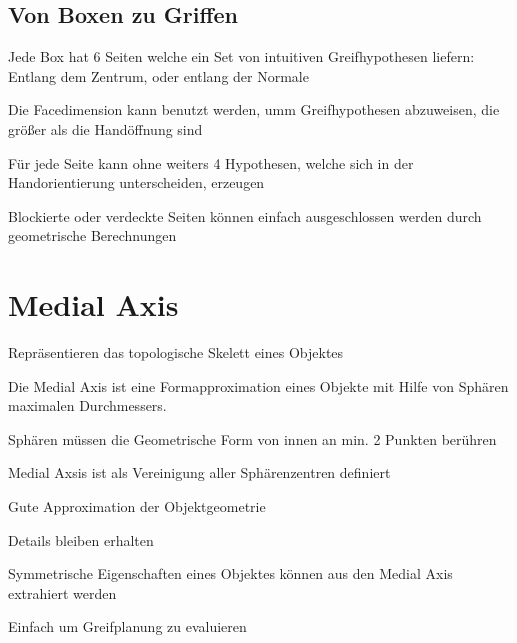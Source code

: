 \subsection{Von Boxen zu Griffen}
\begin{compactitem}
    \item Jede Box hat 6 Seiten welche ein Set von intuitiven Greifhypothesen liefern:
    Entlang dem Zentrum, oder entlang der Normale
    \item Die Facedimension kann benutzt werden, umm Greifhypothesen abzuweisen, die
    größer als die Handöffnung sind
    \item Für jede Seite kann ohne weiters 4 Hypothesen, welche sich in der Handorientierung
    unterscheiden, erzeugen
    \item Blockierte oder verdeckte Seiten können einfach ausgeschlossen werden durch
    geometrische Berechnungen
\end{compactitem}

\section{Medial Axis}
\begin{compactitem}
    \item Repräsentieren das topologische Skelett eines Objektes
    \item Die Medial Axis ist eine Formapproximation eines Objekte mit Hilfe von
     Sphären maximalen Durchmessers.
    \item Sphären müssen die Geometrische Form von innen an min. 2 Punkten berühren
    \item Medial Axsis ist als Vereinigung aller Sphärenzentren definiert

\end{compactitem}
\begin{compactitem}
    \item Gute Approximation der Objektgeometrie
    \item Details bleiben erhalten
    \item Symmetrische Eigenschaften eines Objektes können aus den Medial Axis
    extrahiert werden
    \item Einfach um Greifplanung zu evaluieren
\end{compactitem}

